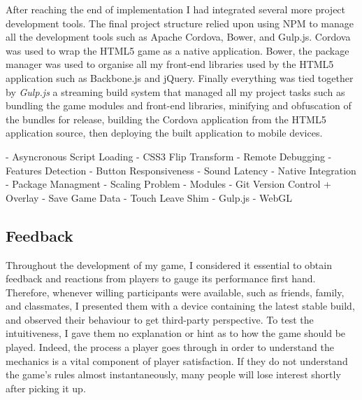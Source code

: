 \documentclass[final]{cmpreport}
\begin{document}
After reaching the end of implementation I had integrated several more project development tools. The final project structure relied upon using NPM to manage all the development tools such as Apache Cordova, Bower, and Gulp.js. Cordova was used to wrap the HTML5 game as a native application. Bower, the package manager was used to organise all my front-end libraries used by the HTML5 application such as Backbone.js and jQuery. Finally everything was tied together by \textit{Gulp.js} a streaming build system that managed all my project tasks such as bundling the game modules and front-end libraries, minifying and obfuscation of the bundles for release, building the Cordova application from the HTML5 application source, then deploying the built application to mobile devices.

- Asyncronous Script Loading
- CSS3 Flip Transform
- Remote Debugging
- Features Detection
- Button Responsiveness
- Sound Latency
- Native Integration
- Package Managment
- Scaling Problem
- Modules
- Git Version Control + Overlay
- Save Game Data
- Touch Leave Shim
- Gulp.js
- WebGL


\subsection{Feedback}
Throughout the development of my game, I considered it essential to obtain feedback and reactions from players to gauge its performance first hand. Therefore, whenever willing participants were available, such as friends, family, and classmates, I presented them with a device containing the latest stable build, and observed their behaviour to get third-party perspective. To test the intuitiveness, I gave them no explanation or hint as to how the game should be played. Indeed, the process a player goes through in order to understand the mechanics is a vital component of player satisfaction. If they do not understand the game's rules almost instantaneously, many people will lose interest shortly after picking it up.
\end{document}
